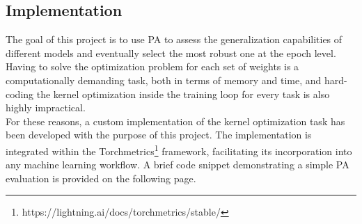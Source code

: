 \subsection{Implementation}

The goal of this project is to use PA
to assess the generalization capabilities of different models and eventually select the most robust one at
the epoch level. Having to solve the optimization problem for each set of weights is a 
computationally demanding task, both in terms of memory and time, and hard-coding the 
kernel optimization inside the training loop for every task
is also highly impractical. \\

For these reasons, a custom implementation of the kernel optimization task has been
developed with the purpose of this project. The implementation is integrated within
the Torchmetrics\footnote{https://lightning.ai/docs/torchmetrics/stable/}
framework, facilitating its incorporation into any machine learning workflow.
A brief code snippet demonstrating a simple PA evaluation is provided on the following page. \\




